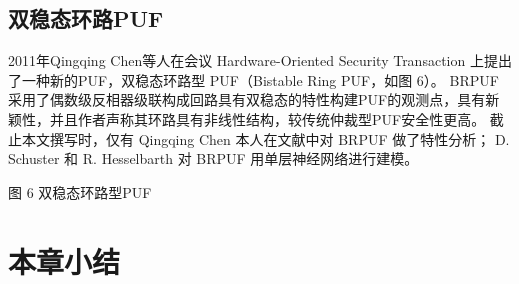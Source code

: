 \subsection{双稳态环路PUF}
2011年Qingqing Chen等人在会议 Hardware-Oriented Security Transaction 上提出了一种新的PUF，双稳态环路型 PUF（Bistable Ring PUF，如图 6）。 BRPUF采用了偶数级反相器级联构成回路具有双稳态的特性构建PUF的观测点，具有新颖性，并且作者声称其环路具有非线性结构，较传统仲裁型PUF安全性更高。
截止本文撰写时，仅有 Qingqing Chen 本人在文献\supercite{chen2012characterization}中对 BRPUF 做了特性分析； D. Schuster 和 R. Hesselbarth 对 BRPUF 用单层神经网络进行建模。\supercite{test-en}
 
图 6 双稳态环路型PUF

\section{本章小结}
